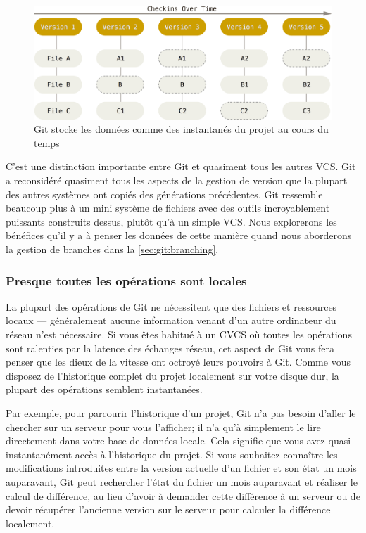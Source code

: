 \begin{figure}[H]
  \centering
  \includegraphics{images/snapshots}
  \caption{Git stocke les données comme des instantanés du projet au cours du temps}
  \label{fig:git:snapshots}
\end{figure}

C'est une distinction importante entre Git et quasiment tous les autres VCS.
Git a reconsidéré quasiment tous les aspects de la gestion de version que la plupart des autres systèmes ont copiés des générations précédentes.
Git ressemble beaucoup plus à un mini système de fichiers avec des outils incroyablement puissants construits dessus, plutôt qu'à un simple VCS.
Nous explorerons les bénéfices qu'il y a à penser les données de cette manière quand nous aborderons la gestion de branches dans la \autoref{sec:git:branching}.

\subsubsection{Presque toutes les opérations sont locales}

La plupart des opérations de Git ne nécessitent que des fichiers et ressources locaux  --- généralement aucune information venant d'un autre ordinateur du réseau n'est nécessaire.
Si vous êtes habitué à un CVCS où toutes les opérations sont ralenties par la latence des échanges réseau, cet aspect de Git vous fera penser que les dieux de la vitesse ont octroyé leurs pouvoirs à Git.
Comme vous disposez de l'historique complet du projet localement sur votre disque dur, la plupart des opérations semblent instantanées.

Par exemple, pour parcourir l'historique d'un projet, Git n'a pas besoin d'aller le chercher sur un serveur pour vous l'afficher;
il n'a qu'à simplement le lire directement dans votre base de données locale.
Cela signifie que vous avez quasi-instantanément accès à l'historique du projet.
Si vous souhaitez connaître les modifications introduites entre la version actuelle d'un fichier et son état un mois auparavant, Git peut rechercher l'état du fichier un mois auparavant et réaliser le calcul de différence, au lieu d'avoir à demander cette différence à un serveur ou de devoir récupérer l'ancienne version sur le serveur pour calculer la différence localement.

